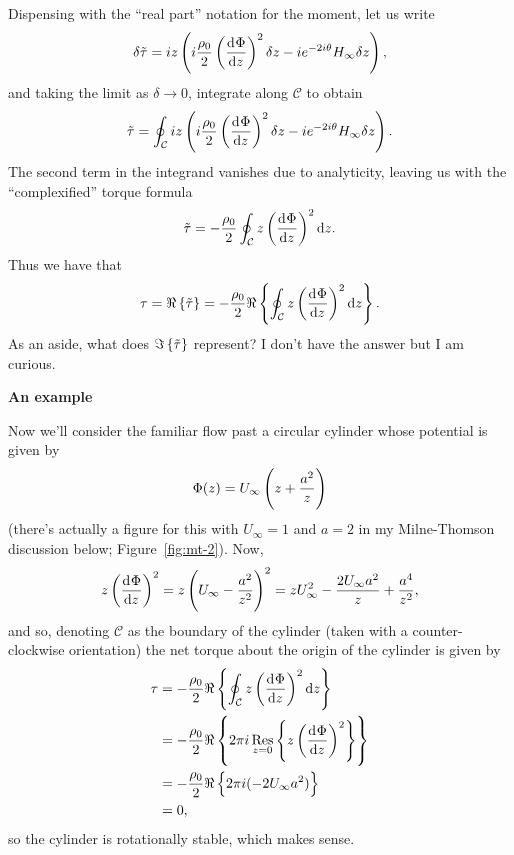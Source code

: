 \documentclass{article}
\DeclareMathOperator*{\res}{Res}
\newcommand{\fC}{\mathcal{C}} %
\newcommand{\dz}{\delta z}
\newcommand{\titau}{\tilde{\tau}}
\newcommand{\tidtau}{\delta \tilde{\tau}}
\begin{document}
%
Dispensing with the ``real part'' notation for the moment, let us write
%
\begin{equation*}
    \tidtau =
        i z \del{i \frac{\rho_0}{2} \del{\dod{\Phi}{z}}^2 \dz
        - i e^{- 2 i \theta} H_\infty \dz}
    ,
\end{equation*}
%
and taking the limit as $\delta \to 0$, integrate along $\fC$ to obtain
%
\begin{equation*}
    \titau =
        \oint_\fC
        i z \del{i \frac{\rho_0}{2} \del{\dod{\Phi}{z}}^2 \dz
        - i e^{- 2 i \theta} H_\infty \dz}
    .
\end{equation*}
%
The second term in the integrand vanishes due to analyticity, leaving us
with the ``complexified'' torque formula
%
\begin{equation*}
    \titau =
    - \frac{\rho_0}{2} \oint_\fC z \del{\dod{\Phi}{z}}^2 \dif z
    .
\end{equation*}
%
Thus we have that
%
\begin{equation*}
    \tau = \Re \cbr{\titau} =
    - \frac{\rho_0}{2} \Re \cbr{\oint_\fC z \del{\dod{\Phi}{z}}^2 \dif z}
    .
\end{equation*}
%
As an aside, what does $\Im \cbr{\titau}$ represent? I don't have the
answer but I am curious.

\textbf{An example}

Now we'll consider the familiar flow past a circular cylinder whose
potential is given by
%
\begin{equation*}
    \Phi(z) = U_\infty \del{z + \frac{a^2}{z}}
\end{equation*}
%
(there's actually a figure for this with $U_\infty = 1$ and $a = 2$ in
my Milne-Thomson discussion below; Figure~\ref{fig:mt-2}). Now,
%
\begin{equation*}
    z \del{\dod{\Phi}{z}}^2
        = z \del{U_\infty - \frac{a^2}{z^2}}^2
        = z U_\infty^2 - \frac{2 U_\infty a^2}{z} + \frac{a^4}{z^2}
    ,
\end{equation*}
%
and so, denoting $\fC$ as the boundary of the cylinder (taken with a
counter-clockwise orientation) the net torque about the origin of the
cylinder is given by
%
\begin{align*}
    \tau
        &= - \frac{\rho_0}{2} \Re \cbr{\oint_\fC z \del{\dod{\Phi}{z}}^2 \dif z} \\
        &= - \frac{\rho_0}{2} \Re \cbr{2 \pi i\res_{z = 0} \cbr{z \del{\dod{\Phi}{z}}^2}} \\
        &= - \frac{\rho_0}{2} \Re \cbr{2 \pi i (-2 U_\infty a^2)} \\
        &= 0
     ,
\end{align*}
%
so the cylinder is rotationally stable, which makes sense.
\end{document}
